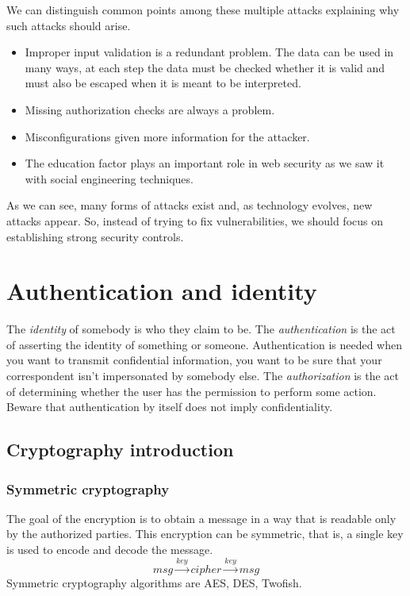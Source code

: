 We can distinguish common points among these multiple attacks explaining why
such attacks should arise.

\begin{itemize}
\item Improper input validation is a redundant problem. The data can be used
	in many ways, at each step the data must be checked whether it is valid
	and must also be escaped when it is meant to be interpreted.
\item Missing authorization checks are always a problem.
\item Misconfigurations given more information for the attacker.
\item The education factor plays an important role in web security as we saw
	it with social engineering techniques.
\end{itemize}

As we can see, many forms of attacks exist and, as technology evolves, new
attacks appear. So, instead of trying to fix vulnerabilities, we should focus
on establishing strong security controls.

\section{Authentication and identity}

The \emph{identity} of somebody is who they claim to be.
The \emph{authentication} is the act of asserting the identity of something or
someone.
Authentication is needed when you want to transmit confidential
information, you want to be sure that your correspondent isn't
impersonated by somebody else.
The \emph{authorization} is the act of determining whether the user has the
permission to perform some action.
Beware that authentication by itself does not imply confidentiality.

\subsection{Cryptography introduction}

\subsubsection{Symmetric cryptography}
The goal of the encryption is to obtain a message in a way that is readable
only by the authorized parties.
This encryption can be symmetric, that is, a single key is used to encode and
decode the message.
\[ msg \xrightarrow{key} cipher \xrightarrow{key} msg \]
Symmetric cryptography algorithms are AES, DES, Twofish.

